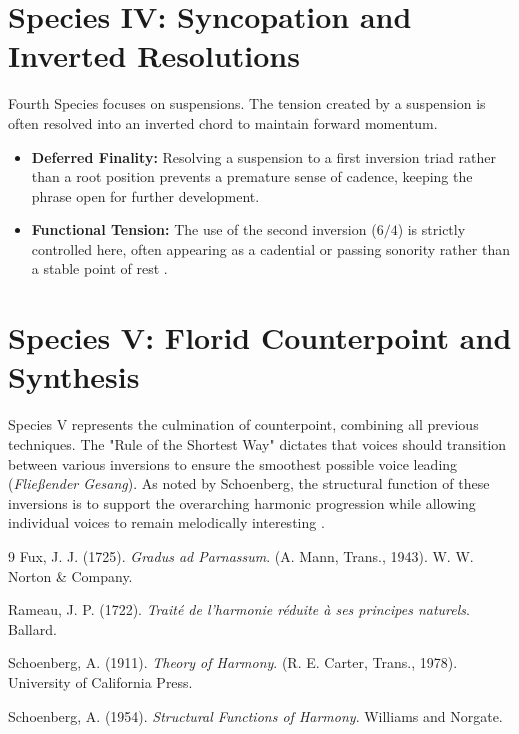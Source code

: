 \documentclass[11pt,a4paper]{article}
\begin{document}
\section{Species IV: Syncopation and Inverted Resolutions}
Fourth Species focuses on suspensions. The tension created by a suspension is often resolved into an inverted chord to maintain forward momentum.
\begin{itemize}
    \item \textbf{Deferred Finality:} Resolving a suspension to a first inversion triad rather than a root position prevents a premature sense of cadence, keeping the phrase open for further development.
    \item \textbf{Functional Tension:} The use of the second inversion ($6/4$) is strictly controlled here, often appearing as a cadential or passing sonority rather than a stable point of rest \citep{rameau1722}.
\end{itemize}

\section{Species V: Florid Counterpoint and Synthesis}
Species V represents the culmination of counterpoint, combining all previous techniques. The "Rule of the Shortest Way" dictates that voices should transition between various inversions to ensure the smoothest possible voice leading (\textit{Fließender Gesang}). As noted by Schoenberg, the structural function of these inversions is to support the overarching harmonic progression while allowing individual voices to remain melodically interesting \citep{schoenberg1954}.

\begin{thebibliography}{9}
Fux, J. J. (1725). \textit{Gradus ad Parnassum}. (A. Mann, Trans., 1943). W. W. Norton \& Company.

Rameau, J. P. (1722). \textit{Traité de l'harmonie réduite à ses principes naturels}. Ballard.

Schoenberg, A. (1911). \textit{Theory of Harmony}. (R. E. Carter, Trans., 1978). University of California Press.

Schoenberg, A. (1954). \textit{Structural Functions of Harmony}. Williams and Norgate.
\end{thebibliography}
\end{document}
